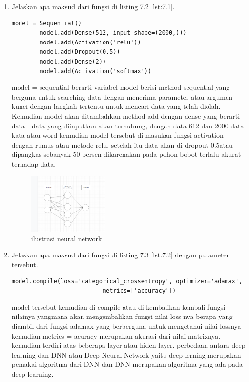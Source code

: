 \begin{enumerate}
    \item Jelaskan apa maksud dari fungsi di listing 7.2 \ref{lst:7.1}. 
    \begin{lstlisting}[caption=Membuat model Neural Network,label={lst:7.1}]
        model = Sequential()
        model.add(Dense(512, input_shape=(2000,)))
        model.add(Activation('relu'))
        model.add(Dropout(0.5))
        model.add(Dense(2))
        model.add(Activation('softmax'))
    \end{lstlisting}
    \hfill\break
    model = sequential berarti variabel model berisi method sequential yang berguna untuk searching data dengan menerima parameter atau argumen kunci dengan langkah tertentu untuk mencari data yang telah diolah. Kemudian model akan ditambahkan method add dengan dense yang berarti data - data yang diinputkan akan terhubung, dengan data 612 dan 2000 data kata atau word kemudian model tersebut di masukan fungsi activation dengan rumus atau metode relu. setelah itu data akan di dropout 0.5atau dipangkas sebanyak 50 persen dikarenakan pada pohon bobot terlalu akurat terhadap data.
    \begin{figure}[H]
	    \centering
	    \includegraphics[width=4cm]{figures/1174077/7/teori_9.PNG}
	    \caption{ilustrasi neural network}
    \end{figure}

    \item Jelaskan apa maksud dari fungsi di listing 7.3 \ref{lst:7.2}  dengan parameter tersebut.
    \begin{lstlisting}[caption=Compile model,label={lst:7.2}]
        model.compile(loss='categorical_crossentropy', optimizer='adamax',
                          metrics=['accuracy'])
    \end{lstlisting}
    model tersebut kemudian di compile atau di kembalikan kembali fungsi nilainya yangmana akan mengembalikan fungsi nilai loss nya berapa yang diambil dari fungsi adamax yang berberguna untuk mengetahui nilai lossnya kemudian metrics = acuracy merupakan akurasi dari nilai matrixnya. kemudian terdiri atas beberapa layer atau hiden layer. perbedaan antara deep learning dan DNN atau Deep Neural Network yaitu deep lerning merupakan pemakai algoritma dari DNN dan DNN merupakan algoritma yang ada pada deep learning.


\end{enumerate}
